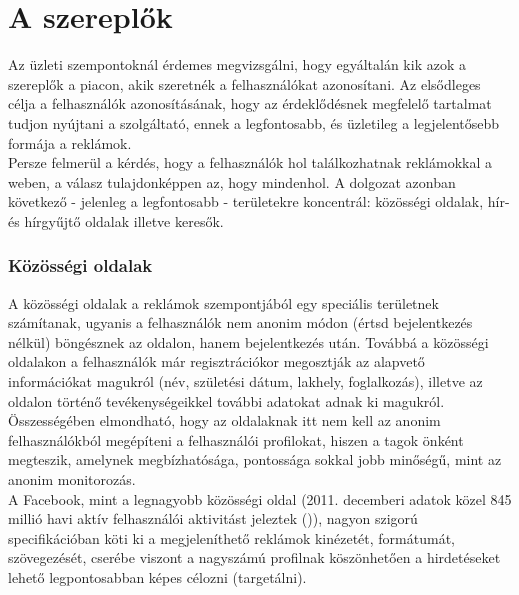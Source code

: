 \section{A szereplők} %
\label{sec:a_szereplők}

Az üzleti szempontoknál érdemes megvizsgálni, hogy egyáltalán kik azok a szereplők a piacon, akik szeretnék a felhasználókat azonosítani. Az elsődleges célja a felhasználók azonosításának, hogy az érdeklődésnek megfelelő tartalmat tudjon nyújtani a szolgáltató, ennek a legfontosabb, és üzletileg a legjelentősebb formája a reklámok.\hfill\\

Persze felmerül a kérdés, hogy a felhasználók hol találkozhatnak reklámokkal a weben, a válasz tulajdonképpen az, hogy mindenhol. A dolgozat azonban következő - jelenleg a legfontosabb - területekre koncentrál: közösségi oldalak, hír- és hírgyűjtő oldalak illetve keresők.

\subsubsection{Közösségi oldalak} %
\label{ssub:közösségi_oldalak}

A közösségi oldalak a reklámok szempontjából egy speciális területnek számítanak, ugyanis a felhasználók nem anonim módon (értsd bejelentkezés nélkül) böngésznek az oldalon, hanem bejelentkezés után. Továbbá a közösségi oldalakon a felhasználók már regisztrációkor megosztják az alapvető információkat magukról (név, születési dátum, lakhely, foglalkozás), illetve az oldalon történő tevékenységeikkel további adatokat adnak ki magukról. Összességében elmondható, hogy az oldalaknak itt nem kell az anonim felhasználókból megépíteni a felhasználói profilokat, hiszen a tagok önként megteszik, amelynek megbízhatósága, pontossága sokkal jobb minőségű, mint az anonim monitorozás.\hfill\\

A Facebook, mint a legnagyobb közösségi oldal (2011. decemberi adatok közel 845 millió havi aktív felhasználói aktivitást jeleztek (\cite{fb_stat})), nagyon szigorú specifikációban köti ki a megjeleníthető reklámok kinézetét, formátumát, szövegezését, cserébe viszont a nagyszámú profilnak köszönhetően a hirdetéseket lehető legpontosabban képes célozni (targetálni). \cite{thinkdigital_fb}

